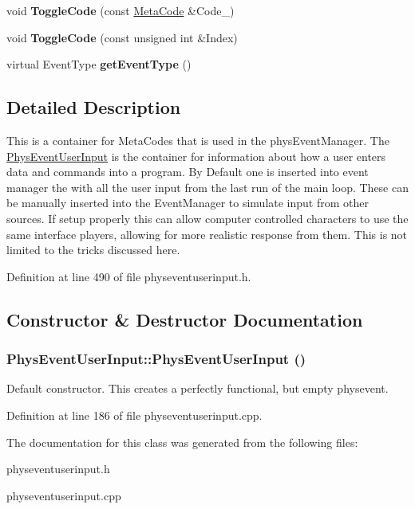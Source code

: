 \begin{DoxyCompactItemize}
\item 
\hypertarget{classPhysEventUserInput_a8325bb0172db6ea02fd06f4a5d1a7378}{
void {\bfseries ToggleCode} (const \hyperlink{classMetaCode}{MetaCode} \&Code\_\-)}
\label{dc/d0e/classPhysEventUserInput_a8325bb0172db6ea02fd06f4a5d1a7378}

\item 
\hypertarget{classPhysEventUserInput_a2e8e56d7e25deaf0e5f9672a780489a2}{
void {\bfseries ToggleCode} (const unsigned int \&Index)}
\label{dc/d0e/classPhysEventUserInput_a2e8e56d7e25deaf0e5f9672a780489a2}

\item 
\hypertarget{classPhysEventUserInput_a7adabb15e8012a86c9da1910033eea4b}{
virtual EventType {\bfseries getEventType} ()}
\label{dc/d0e/classPhysEventUserInput_a7adabb15e8012a86c9da1910033eea4b}

\end{DoxyCompactItemize}


\subsection{Detailed Description}
This is a container for MetaCodes that is used in the physEventManager. The \hyperlink{classPhysEventUserInput}{PhysEventUserInput} is the container for information about how a user enters data and commands into a program. By Default one is inserted into event manager the with all the user input from the last run of the main loop. These can be manually inserted into the EventManager to simulate input from other sources. If setup properly this can allow computer controlled characters to use the same interface players, allowing for more realistic response from them. This is not limited to the tricks discussed here. 

Definition at line 490 of file physeventuserinput.h.

\subsection{Constructor \& Destructor Documentation}
\hypertarget{classPhysEventUserInput_a6f8eaf698e8109d5cb30f2f17044f1ba}{
\subsubsection[{PhysEventUserInput}]{\setlength{\rightskip}{0pt plus 5cm}PhysEventUserInput::PhysEventUserInput ()}}
\label{dc/d0e/classPhysEventUserInput_a6f8eaf698e8109d5cb30f2f17044f1ba}


Default constructor. This creates a perfectly functional, but empty physevent. 

Definition at line 186 of file physeventuserinput.cpp.

The documentation for this class was generated from the following files:\begin{DoxyCompactItemize}
\item 
physeventuserinput.h\item 
physeventuserinput.cpp\end{DoxyCompactItemize}

